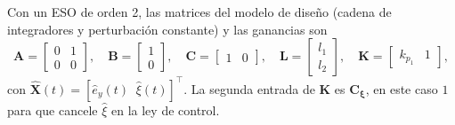Con un ESO de orden 2, las matrices del modelo de diseño (cadena de integradores
y perturbación constante) y las ganancias son
\begin{equation}
\mathbf{A} = \begin{bmatrix} 0 & 1 \\ 0 & 0 \end{bmatrix},\quad
\mathbf{B} = \begin{bmatrix} 1 \\ 0 \end{bmatrix},\quad
\mathbf{C} = \begin{bmatrix} 1 & 0 \end{bmatrix},\quad
\mathbf{L} = \begin{bmatrix} l_1 \\ l_2 \end{bmatrix},\quad
\mathbf{K} = \begin{bmatrix} k_{p_1} & 1 \end{bmatrix} ,
\end{equation}
con $\widehat{\mathbf{X}}(t) = [\hat{e}_y(t) \;\; \hat{\xi}(t)]^{\top}$. La segunda entrada
de $\mathbf{K}$ es $\mathbf{C_\xi}$, en este caso $1$ para que cancele $\hat{\xi}$ en la ley de control.

